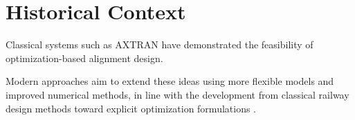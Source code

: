 
\section{Historical Context}

Classical systems such as AXTRAN have demonstrated the feasibility of
optimization-based alignment design.

Modern approaches aim to extend these ideas using more flexible models
and improved numerical methods, in line with the development from
classical railway design methods toward explicit optimization
formulations \cite{Kufver2000RailwayAlignment}.


